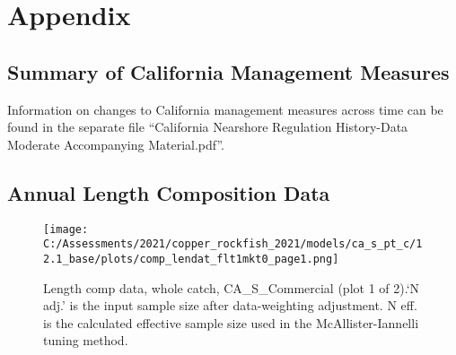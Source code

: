 \documentclass[11pt,
  english,
  a4paper,
]{article}
\begin{document}
\tagmcend\tagstructend

\clearpage


\hypertarget{appendix}{%
\section{Appendix}\label{appendix}}

\leavevmode\tagmcend\tagstructend


\hypertarget{ca-man}{%
\subsection{Summary of California Management Measures}\label{ca-man}}

\leavevmode\tagmcend\tagstructend


Information on changes to California management measures across time can be found in the separate file ``California Nearshore Regulation History-Data Moderate Accompanying Material.pdf''.

\leavevmode\tagmcend\tagstructend\par


\hypertarget{length-data}{%
\subsection{Annual Length Composition Data}\label{length-data}}

\leavevmode\tagmcend\tagstructend


\begin{figure}
\centering
\texttt{[image: C:/Assessments/2021/copper\_rockfish\_2021/models/ca\_s\_pt\_c/12.1\_base/plots/comp\_lendat\_flt1mkt0\_page1.png]}
\caption{Length comp data, whole catch, CA\_S\_Commercial (plot 1 of 2).`N adj.' is the input sample size after data-weighting adjustment. N eff. is the calculated effective sample size used in the McAllister-Iannelli tuning method.\label{fig:comp_lendat_flt1mkt0_page1}}
\end{figure}
\end{document}

